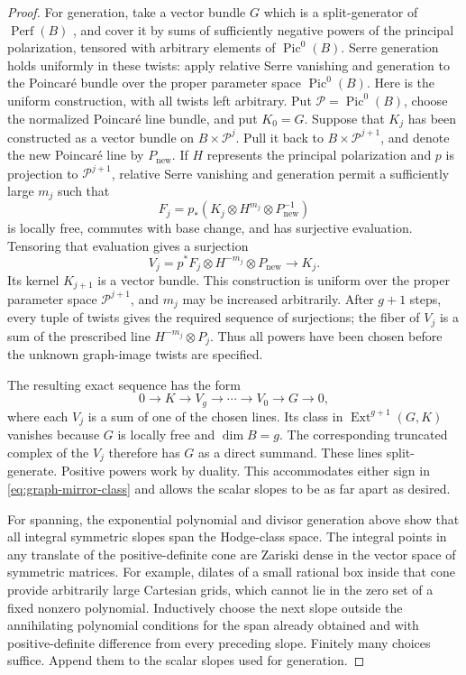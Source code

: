 \documentclass[11pt]{article}
\numberwithin{equation}{section}
\theoremstyle{definition}
\theoremstyle{remark}
\begin{document}
\begin{proof}
For generation, take a vector bundle $G$ which is a split-generator of
$\operatorname{Perf}(B)$ \cite[Section~3.5]{History:ToenVaquie}, and cover it by sums of sufficiently negative powers of
the principal polarization, tensored with arbitrary elements of
$\operatorname{Pic}^0(B)$.  Serre generation holds uniformly in these
twists: apply relative Serre vanishing and generation to the Poincar\'e
bundle over the proper parameter space $\operatorname{Pic}^0(B)$.
Here is the uniform construction, with all twists left arbitrary.
Put $\mathcal P=\operatorname{Pic}^0(B)$, choose the normalized
Poincar\'e line bundle, and put $K_0=G$.  Suppose that $K_j$ has
been constructed as a vector bundle on $B\times\mathcal P^j$.
Pull it back to $B\times\mathcal P^{j+1}$, and denote the new
Poincar\'e line by $P_{\mathrm{new}}$.  If $H$ represents the
principal polarization and $p$ is projection to
$\mathcal P^{j+1}$, relative Serre vanishing and generation
permit a sufficiently large $m_j$ such that
\[
 F_j=p_*(K_j\otimes H^{m_j}\otimes P_{\mathrm{new}}^{-1})
\]
is locally free, commutes with base change, and has surjective
evaluation.  Tensoring that evaluation gives a surjection
\[
 V_j=p^*F_j\otimes H^{-m_j}\otimes P_{\mathrm{new}}
 \longrightarrow K_j.
\]
Its kernel $K_{j+1}$ is a vector bundle.  This construction is
uniform over the proper parameter space $\mathcal P^{j+1}$,
and $m_j$ may be increased arbitrarily.  After $g+1$ steps,
every tuple of twists gives the required sequence of
surjections; the fiber of $V_j$ is a sum of the prescribed
line $H^{-m_j}\otimes P_j$.  Thus all powers have been chosen
before the unknown graph-image twists are specified.

The resulting exact sequence has the form
\[
 0\longrightarrow K\longrightarrow V_g\longrightarrow\cdots
 \longrightarrow V_0\longrightarrow G\longrightarrow0,
\]
where each $V_j$ is a sum of one of the chosen lines.  Its class in
$\operatorname{Ext}^{g+1}(G,K)$ vanishes because $G$ is locally free and $\dim B=g$.
The corresponding truncated complex of the $V_j$ therefore has $G$
as a direct summand.  These lines split-generate.  Positive powers work
by duality.  This accommodates either sign in
\eqref{eq:graph-mirror-class} and allows the scalar slopes to be as
far apart as desired.

For spanning, the exponential polynomial and divisor generation above
show that all integral symmetric slopes span the Hodge-class space.
The integral points in any translate of the positive-definite cone
are Zariski dense in the vector space of symmetric matrices.  For
example, dilates of a small rational box inside that cone provide
arbitrarily large Cartesian grids, which cannot lie in the zero set
of a fixed nonzero polynomial.  Inductively choose the next slope
outside the annihilating polynomial conditions for the span already
obtained and with positive-definite difference from every preceding
slope.  Finitely many choices suffice.  Append them to the scalar
slopes used for generation.
\end{proof}
\end{document}
